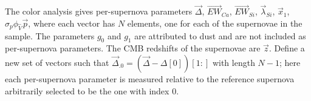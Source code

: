 \documentclass{aastex61}   	%
\begin{document}
% 
%    
%    
%     
% 
% 
%
%
%
%
%   
%    


%

The color analysis gives per-supernova parameters
$\vec{\Delta}$,  $\overrightarrow{EW}_{Ca}$,  $\overrightarrow{EW}_{Si}$,  $\vec{\lambda}_{Si}$,   $\vec{x}_1$,  $\sigma_p\phi_{\hat{V}}  \vec{p}$,
where each vector has $N$ elements, one for each of the supernovae in the sample.  The parameters $g_0$ and $g_1$ are attributed to dust
and are not included as per-supernova parameters.  The CMB redshifts of the supernovae are $\vec{z}$.  Define a new set of vectors such that
$\vec{\Delta}_{.0} = (\vec{\Delta} - \Delta[0])[1:]$ with length $N-1$; here each per-supernova parameter is measured relative to the
reference supernova arbitrarily selected to be the one with index 0.
\end{document}
